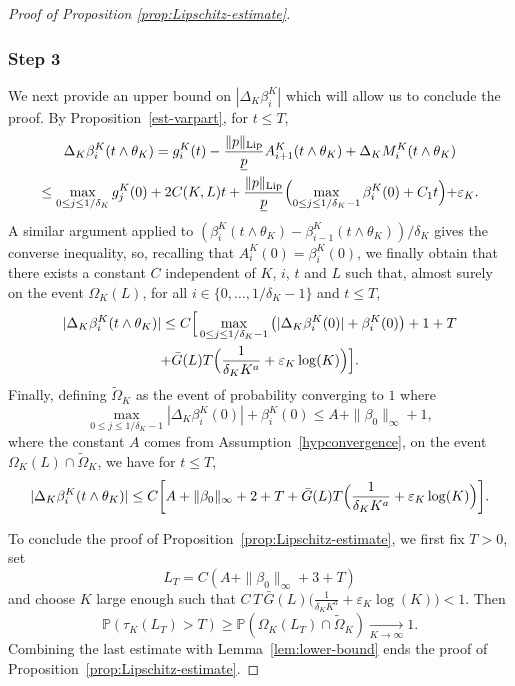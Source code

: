 \documentclass[10pt]{amsart}
\theoremstyle{plain}
\theoremstyle{remark}
\renewcommand\P{\mathbb{P}}
\begin{document}
\begin{proof}[Proof of Proposition \ref{prop:Lipschitz-estimate}]
{\subsubsection*{Step 3} We next provide an upper bound on $|\Delta_K\beta_i^K|$ which will allow us to conclude the proof.
By Proposition~\ref{est-varpart}, for $t\leq T$,
\begin{multline*}
\Delta_K\beta_i^K(t\wedge\theta_K) =g_i^K(t) - \frac{\|p\|_{\text{Lip}}}{\underline{p}} A_{i+1}^K(t\wedge\theta_K)+
\Delta_KM_i^K(t\wedge\theta_K) \\
\leq \max_{0\leq j\leq 1/\delta_K} g^K _j(0)+2 C(K,L) t+ \frac{\|p\|_{\text{Lip}}}{\underline{p}}\Bigl(\max_{0\leq j\leq 1/\delta_K-1}\beta^K_i(0)+C_1 t\Bigl)+\varepsilon_K.
\end{multline*}
A similar argument applied to $(\beta^K_i(t\wedge\theta_K)-\beta^K_{i-1}(t\wedge\theta_K))/\delta_K$ gives the converse inequality, so, recalling that $A^K_i(0)=\beta^K_i(0)$, we finally obtain that there exists a constant $C$ independent of $K$, $i$, $t$ and $L$ such that, almost surely on the event $\Omega_K(L)$, for all $i\in\{0,\ldots,1/\delta_K-1\}$ and $t\leq T$,
\begin{multline*}
|\Delta_K\beta_i^K(t\wedge\theta_K)|\leq C\Big[\max_{0\leq j\leq 1/\delta_K-1} \left(|\Delta_K \beta^K_i(0)|+\beta^K_i(0)\right)+1+T\\
+\bar{G}(L) T\Bigl(\frac{1}{\delta_K K^
a}+\varepsilon_K\log(K)\Bigr)\Big].
\end{multline*}
Finally, defining $\widetilde \Omega_K$ as the event of probability converging to $1$ where
\[\max_{0\leq j\leq 1/\delta_K-1} |\Delta_K \beta^K_i(0)|+\beta^K_i(0)\le A+\|\beta_0\|_\infty+1,\] where the constant $A$ comes from Assumption~\ref{hypconvergence}, on the event $\Omega_K(L) \cap \widetilde \Omega_K$, we have for $t\leq T$,
\begin{equation*}
|\Delta_K\beta_i^K(t\wedge\theta_K)|\leq C\biggl[A+\|\beta_0\|_\infty+2 +T+ \bar G(L) T\Bigl(\frac{1}{\delta_K K^
a}+\varepsilon_K\log(K)\Bigr)\biggr].
\end{equation*}

To conclude the proof of Proposition~\ref{prop:Lipschitz-estimate}, we first fix $T>0$, set
\begin{equation*}%
L_T=C(A+\|\beta_0\|_\infty+3+T)
\end{equation*}
and choose $K$ large enough such that $C\,T\,\bar G(L)\bigl(\frac{1}{\delta_K K^
a}+\varepsilon_K\log(K)\bigr)< 1$.
Then
\[\P(\tau_K(L_T)>T)\ge \P(\Omega_K(L_T)\cap \widetilde \Omega_K)\xrightarrow[K\to\infty]{} 1.\]
Combining the last estimate with Lemma~\ref{lem:lower-bound} ends the proof of Proposition~\ref{prop:Lipschitz-estimate}.}
\end{proof}
\end{document}
